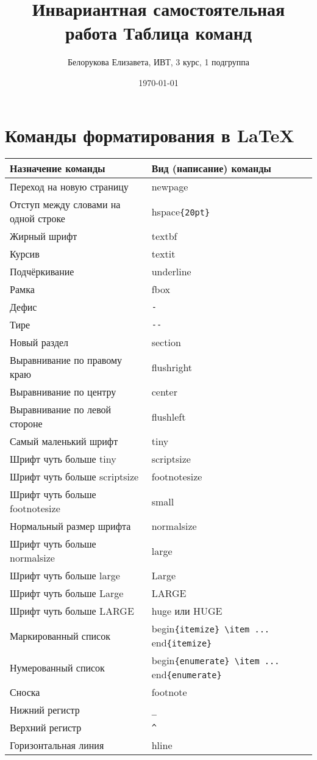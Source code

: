 \documentclass[a4paper,12pt]{article} %
\author{Белорукова Елизавета, ИВТ, 3 курс, 1 подгруппа}
\title{Инвариантная самостоятельная работа Таблица команд}
\date{\today}
\begin{document}
\maketitle
\newpage
\section{Команды форматирования в \LaTeX{}}

\begin{tabular}{| l | l |}
\hline
\textbf{Назначение команды} & \textbf{Вид (написание) команды} \\
\hline
Переход на новую страницу & newpage \\
Отступ между словами на одной строке & hspace\verb|{20pt} |\\
Жирный шрифт & textbf  \\
Курсив & textit \\
Подчёркивание & underline \\
Рамка & fbox \\
Дефис & \verb|- | \\
Тире & \verb|-- | \\
Новый раздел & section \\
Выравнивание по правому краю & flushright \\
Выравнивание по центру & center \\
Выравнивание по левой стороне & flushleft \\
Самый маленький шрифт & tiny \\
Шрифт чуть больше tiny & scriptsize \\
Шрифт чуть больше scriptsize & footnotesize \\
Шрифт чуть больше footnotesize & small \\
Нормальный размер шрифта & normalsize \\
Шрифт чуть больше normalsize & large \\
Шрифт чуть больше large & Large \\
Шрифт чуть больше Large & LARGE \\
Шрифт чуть больше LARGE & huge или HUGE \\
Маркированный список & begin\verb|{itemize}|\verb| \item ...| end\verb|{itemize}|\\
Нумерованный список & begin\verb|{enumerate}|\verb| \item ...| end\verb|{enumerate}|\\
Сноска & footnote \\
Нижний регистр & \verb|_ | \\
Верхний регистр & \verb|^ | \\
Горизонтальная линия & hline \\
\hline
\end{tabular}
\end{document}

